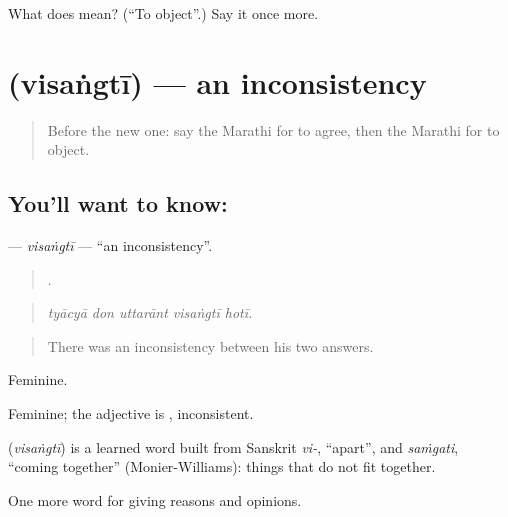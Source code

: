 \begin{tcolorbox}[breakable,colback=teal!4,colframe=teal!35!black,title={Before you move on}]
What does   mean? (\textquotedblleft{}To object\textquotedblright{}.) Say it once more.
\end{tcolorbox}
\section[\texorpdfstring{\mr{विसंगती} (visaṅgtī)}{विसंगती (visaṅgtī)}]{ (visaṅgtī) — an inconsistency}

\label{lesson:MR-C344-visangti}



\begin{quote}
Before the new one: say the Marathi for to agree, then the Marathi for to object.
\end{quote}

\subsection*{You'll want to know: }
\textbf{} — \emph{visaṅgtī} — \textquotedblleft{}an inconsistency\textquotedblright{}.

\begin{quote}
    .
\end{quote}

\begin{quote}
\emph{tyācyā don uttarānt visaṅgtī hotī.}
\end{quote}

\begin{quote}
There was an inconsistency between his two answers.
\end{quote}

Feminine.

Feminine; the adjective is , inconsistent.

\begin{cousinweb}
\textbf{} (\emph{visaṅgtī}) is a learned word built from Sanskrit \emph{vi-}, \textquotedblleft{}apart\textquotedblright{}, and \emph{saṁgati}, \textquotedblleft{}coming together\textquotedblright{} (Monier-Williams): things that do not fit together.
\end{cousinweb}

\begin{grammarlens}[title={What you've built}]
One more word for giving reasons and opinions.
\end{grammarlens}

